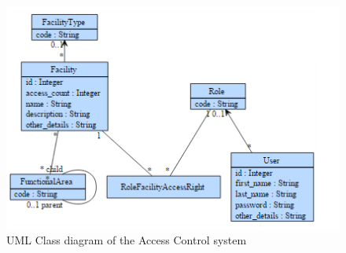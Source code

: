 \begin{figure}[h]
\centering
\includegraphics[width=1\textwidth]{Figures/accessControl.png} 
\caption{UML Class diagram of the Access Control system}
\label{fig:preValidation}
\end{figure}

